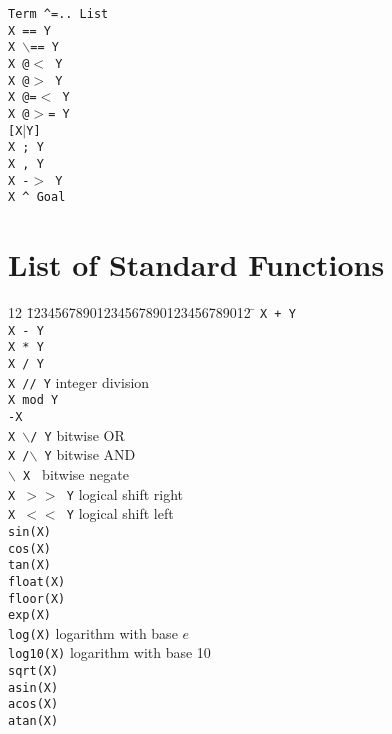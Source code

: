\begin{tabbing}
 \> {\tt Term \verb'^'=.. List}	\>					\\
 \> {\tt X == Y}		\>					\\
 \> {\tt X $\backslash$== Y}	\>					\\
 \> {\tt X @$<$ Y}		\>					\\
 \> {\tt X @$>$ Y}		\>					\\
 \> {\tt X @=$<$ Y}		\>					\\
 \> {\tt X @$>$= Y}		\>					\\
 \> {\tt [X$|$Y]}		\>					\\
 \> {\tt X ; Y}			\>					\\
 \> {\tt X , Y}			\>					\\
 \> {\tt X -$>$ Y}		\>					\\
 \> {\tt X \verb'^' Goal}	\>					\\
\end{tabbing}



\section{List of Standard Functions}

\begin{tabbing}
12 \= 12345678901234567890123456789012 \=	\kill
 \> {\tt X + Y}			\>					\\
 \> {\tt X - Y}			\>					\\
 \> {\tt X * Y}			\>					\\
 \> {\tt X / Y}			\>					\\
 \> {\tt X // Y}		\> integer division			\\
 \> {\tt X mod Y}		\>					\\
 \> {\tt -X}			\>					\\
 \> {\tt X $\backslash$/ Y}	\> bitwise OR				\\
 \> {\tt X /$\backslash$ Y}	\> bitwise AND				\\
 \> {\tt $\backslash$ X }	\> bitwise negate			\\
 \> {\tt X $>>$ Y}		\> logical shift right			\\
 \> {\tt X $<<$ Y}		\> logical shift left			\\
 \> {\tt sin(X)}		\>					\\
 \> {\tt cos(X)}		\>					\\
 \> {\tt tan(X)}		\>					\\
 \> {\tt float(X)}		\>					\\
 \> {\tt floor(X)}		\>					\\
 \> {\tt exp(X)}		\>					\\
 \> {\tt log(X)}		\> logarithm with base $e$		\\
 \> {\tt log10(X)}		\> logarithm with base 10		\\
 \> {\tt sqrt(X)}		\>					\\
 \> {\tt asin(X)}		\>					\\
 \> {\tt acos(X)}		\>					\\
 \> {\tt atan(X)}		\>					\\
\end{tabbing}


